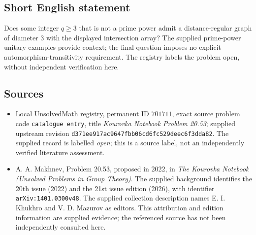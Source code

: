 \documentclass[11pt]{article}
\begin{document}
\subsection{Short English statement}
Does some integer \(q\geq 3\) that is not a prime power admit a distance-regular graph of diameter \(3\) with the displayed intersection array? The supplied prime-power unitary examples provide context; the final question imposes no explicit automorphism-transitivity requirement. The registry labels the problem open, without independent verification here.
\subsection{Sources}
\begin{itemize}
\item Local UnsolvedMath registry, permanent ID \(701711\), exact source problem code \texttt{catalogue entry}, title \emph{Kourovka Notebook Problem 20.53}; supplied upstream revision \texttt{d371ee917ac9647fbb06cd6fc529deec6f3dda82}. The supplied record is labelled \emph{open}; this is a source label, not an independently verified literature assessment.
\item A. A. Makhnev, Problem 20.53, proposed in 2022, in \emph{The Kourovka Notebook (Unsolved Problems in Group Theory)}. The supplied background identifies the 20th issue (2022) and the 21st issue edition (2026), with identifier \texttt{arXiv:1401.0300v48}. The supplied collection description names E. I. Khukhro and V. D. Mazurov as editors. This attribution and edition information are supplied evidence; the referenced source has not been independently consulted here.
\end{itemize}
\end{document}
